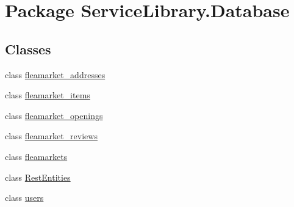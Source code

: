 \hypertarget{namespace_service_library_1_1_database}{\section{Package Service\-Library.\-Database}
\label{namespace_service_library_1_1_database}
}
\subsection*{Classes}
\begin{DoxyCompactItemize}
\item 
class \hyperlink{class_service_library_1_1_database_1_1fleamarket__addresses}{fleamarket\-\_\-addresses}
\item 
class \hyperlink{class_service_library_1_1_database_1_1fleamarket__items}{fleamarket\-\_\-items}
\item 
class \hyperlink{class_service_library_1_1_database_1_1fleamarket__openings}{fleamarket\-\_\-openings}
\item 
class \hyperlink{class_service_library_1_1_database_1_1fleamarket__reviews}{fleamarket\-\_\-reviews}
\item 
class \hyperlink{class_service_library_1_1_database_1_1fleamarkets}{fleamarkets}
\item 
class \hyperlink{class_service_library_1_1_database_1_1_rest_entities}{Rest\-Entities}
\item 
class \hyperlink{class_service_library_1_1_database_1_1users}{users}
\end{DoxyCompactItemize}
